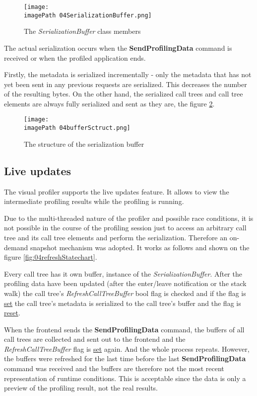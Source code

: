\begin{figure}
	\centering
		\texttt{[image: \\imagePath 04SerializationBuffer.png]}
		\caption{The \textit{SerializationBuffer} class members}
	\label{fig:04SerializationBuffer}
\end{figure}

The actual serialization occurs when the \textbf{SendProfilingData} command is received or when the profiled application ends. 

Firstly, the metadata is serialized incrementally - only the metadata that has not yet been sent in any previous requests are serialized. This decreases the number of the resulting bytes. On the other hand, the serialized call trees and call tree elements are always fully serialized and sent as they are, the figure \ref{fig:04bufferSctruct}.

\begin{figure}
	\centering
		\texttt{[image: \\imagePath 04bufferSctruct.png]}
		\caption{The structure of the serialization buffer }
	\label{fig:04bufferSctruct}
\end{figure}

\subsection{Live updates}
The visual profiler supports the live updates feature. It allows to view the intermediate profiling results while the profiling is running. 

Due to the multi-threaded nature of the profiler and possible race conditions, it is not possible in the course of the profiling session just to access an arbitrary call tree and its call tree elements and perform the serialization. Therefore an on-demand snapshot mechanism was adopted. It works as follows and shown on the figure \ref{fig:04refreshStatechart}. 

Every call tree has it own buffer, instance of the \textit{SerializationBuffer}. After the profiling data have been updated (after the enter/leave notification or the stack walk) the call tree's \textit{RefreshCallTreeBuffer} bool flag is checked and if the flag is \underline{set} the call tree's metadata is serialized to the call tree's buffer and the flag is \underline{reset}. 

When the frontend sends the \textbf{SendProfilingData} command, the buffers of all call trees are collected and sent out to the frontend and the \textit{RefreshCallTreeBuffer} flag is \underline{set} again. And the whole process repeats. However, the buffers were refreshed for the last time before the last \textbf{SendProfilingData} command was received and the buffers are therefore not the most recent representation of runtime conditions. This is acceptable since the data is only a preview of the profiling result, not the real results.

